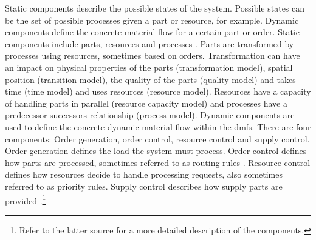 Static components describe the possible states of the system. Possible states can be the set of possible processes given a part or resource, for example. Dynamic components define the concrete material flow for a certain part or order.
Static components include parts, resources and processes \autocite{Schwede2024}. Parts are transformed by processes using resources, sometimes based on orders. Transformation can have an impact on physical properties of the parts (transformation model), spatial position (transition model), the quality of the parts (quality model) and takes time (time model) and uses resources (resource model). Resources have a capacity of handling parts in parallel (resource capacity model) and processes have a predecessor-successors relationship (process model).
Dynamic components are used to define the concrete dynamic material flow within the \gls{dmfs}. There are four components: Order generation, order control, resource control and supply control. Order generation defines the load the system must process. Order control defines how parts are processed, sometimes referred to as routing rules \autocite{mildeautomated}. Resource control defines how resources decide to handle processing requests, also sometimes referred to as priority rules. Supply control describes how supply parts are provided \autocite{mildeautomated,Schwede2024}.\footnote{Refer to the latter source for a more detailed description of the components.}


